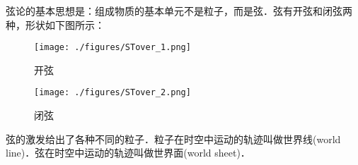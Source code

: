 弦论的基本思想是：组成物质的基本单元不是粒子，而是弦．弦有开弦和闭弦两种，形状如下图所示：
\begin{figure}[ht]
\centering
\texttt{[image: ./figures/STover\_1.png]}
\caption{开弦} \label{STover_fig1}
\end{figure}
\begin{figure}[ht]
\centering
\texttt{[image: ./figures/STover\_2.png]}
\caption{闭弦} \label{STover_fig2}
\end{figure}
弦的激发给出了各种不同的粒子．粒子在时空中运动的轨迹叫做世界线(world line)．弦在时空中运动的轨迹叫做世界面(world sheet)．
